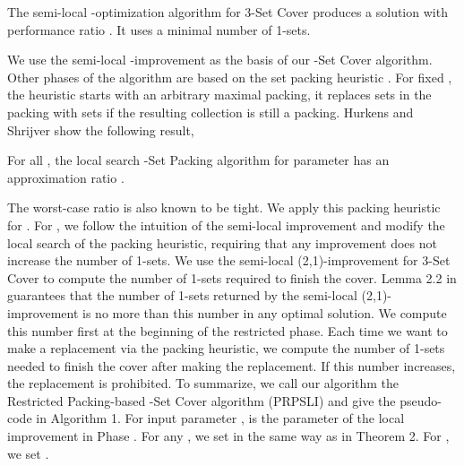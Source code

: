 \documentclass[runningheads,a4paper]{llncs}
\numberwithin{equation}{section}
\begin{document}
\begin{theorem}
The semi-local -optimization algorithm for 3-Set Cover produces a solution with performance ratio . It uses a minimal number of 1-sets.
\end{theorem}

We use the semi-local -improvement as the basis of our -Set Cover algorithm. Other phases of the algorithm are based on the set packing heuristic \cite{schrijver}. For fixed , the heuristic starts with an arbitrary maximal packing, it replaces  sets in the packing with  sets if the resulting collection is still a packing. Hurkens and Shrijver \cite{schrijver} show the following result,

\begin{theorem}
For all , the local search -Set Packing algorithm for parameter  has an approximation ratio .
\end{theorem}

The worst-case ratio is also known to be tight. We apply this packing heuristic for . For , we follow the intuition of the semi-local improvement and modify the local search of the packing heuristic, requiring that any improvement does not increase the number of 1-sets. We use the semi-local (2,1)-improvement for 3-Set Cover to compute the number of 1-sets required to finish the cover. Lemma 2.2 in \cite{furer} guarantees that the number of 1-sets returned by the semi-local (2,1)-improvement is no more than this number in any optimal solution. We compute this number first at the beginning of the restricted phase. Each time we want to make a replacement via the packing heuristic, we compute the number of 1-sets needed to finish the cover after making the replacement. If this number increases, the replacement is prohibited. To summarize, we call our algorithm the Restricted Packing-based -Set Cover algorithm (PRPSLI) and give the pseudo-code in Algorithm 1. For input parameter ,  is the parameter of the local improvement in Phase . For any , we set  in the same way as in Theorem 2. For , we set .
\end{document}
